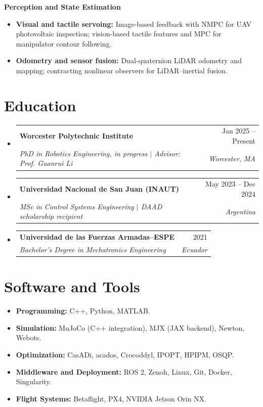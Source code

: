 \documentclass[letterpaper,11pt]{article}
\makeatletter
\newcommand{\resumeSubheading}[4]{
  \vspace{-2pt}\item
    \begin{tabular*}{0.97\textwidth}[t]{l@{\extracolsep{\fill}}r}
      \textbf{#1} & #2 \\
      \textit{\small#3} & \textit{\small #4} \\
    \end{tabular*}\vspace{-7pt}
}
\newcommand{\resumeSubHeadingListStart}{\begin{itemize}[leftmargin=0.15in, label={}]}
\newcommand{\resumeSubHeadingListEnd}{\end{itemize}}
\makeatother
\begin{document}
{\small\textbf{Perception and State Estimation}\par}
\begin{itemize}[leftmargin=0.22in, itemsep=2pt, parsep=0pt, topsep=4pt]
\small
\item \textbf{Visual and tactile servoing:} Image-based feedback with NMPC for UAV photovoltaic inspection; vision-based tactile features and MPC for manipulator contour following.
\item \textbf{Odometry and sensor fusion:} Dual-quaternion LiDAR odometry and mapping; contracting nonlinear observers for LiDAR--inertial fusion.
\end{itemize}

\newpage
\section{Education}
\resumeSubHeadingListStart
\resumeSubheading{Worcester Polytechnic Institute}{Jan 2025 -- Present}
{PhD in Robotics Engineering, in progress $|$ Advisor: Prof. Guanrui Li}{Worcester, MA}
\resumeSubheading{Universidad Nacional de San Juan (INAUT)}{May 2023 -- Dec 2024}
{MSc in Control Systems Engineering $|$ DAAD scholarship recipient}{Argentina}
\resumeSubheading{Universidad de las Fuerzas Armadas--ESPE}{2021}
{Bachelor's Degree in Mechatronics Engineering}{Ecuador}
\resumeSubHeadingListEnd

\section{Software and Tools}
\begin{itemize}[leftmargin=0.15in, label={}, itemsep=2pt, parsep=0pt]
\small
\item \textbf{Programming:} C++, Python, MATLAB.
\item \textbf{Simulation:} MuJoCo (C++ integration), MJX (JAX backend), Newton, Webots.
\item \textbf{Optimization:} CasADi, acados, Crocoddyl, IPOPT, HPIPM, OSQP.
\item \textbf{Middleware and Deployment:} ROS 2, Zenoh, Linux, Git, Docker, Singularity.
\item \textbf{Flight Systems:} Betaflight, PX4, NVIDIA Jetson Orin NX.
\end{itemize}
\end{document}
